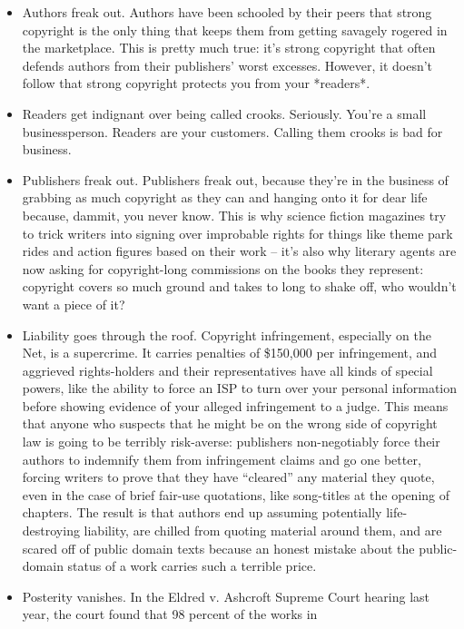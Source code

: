 \begin{itemize}
\item
  Authors freak out. Authors have been schooled by their peers that
  strong copyright is the only thing that keeps them from getting
  savagely rogered in the marketplace. This is pretty much true: it's
  strong copyright that often defends authors from their publishers'
  worst excesses. However, it doesn't follow that strong copyright
  protects you from your *readers*.
\item
  Readers get indignant over being called crooks. Seriously. You're a
  small businessperson. Readers are your customers. Calling them
  crooks is bad for business.
\item
  Publishers freak out. Publishers freak out, because they're in the
  business of grabbing as much copyright as they can and hanging onto
  it for dear life because, dammit, you never know. This is why
  science fiction magazines try to trick writers into signing over
  improbable rights for things like theme park rides and action
  figures based on their work -- it's also why literary agents are
  now asking for copyright-long commissions on the books they
  represent: copyright covers so much ground and takes to long to
  shake off, who wouldn't want a piece of it?
\item
  Liability goes through the roof. Copyright infringement, especially
  on the Net, is a supercrime. It carries penalties of \$150,000 per
  infringement, and aggrieved rights-holders and their
  representatives have all kinds of special powers, like the ability
  to force an ISP to turn over your personal information before
  showing evidence of your alleged infringement to a judge. This
  means that anyone who suspects that he might be on the wrong side
  of copyright law is going to be terribly risk-averse: publishers
  non-negotiably force their authors to indemnify them from
  infringement claims and go one better, forcing writers to prove
  that they have ``cleared'' any material they quote, even in the case
  of brief fair-use quotations, like song-titles at the opening of
  chapters. The result is that authors end up assuming potentially
  life-destroying liability, are chilled from quoting material around
  them, and are scared off of public domain texts because an honest
  mistake about the public-domain status of a work carries such a
  terrible price.
\item
  Posterity vanishes. In the Eldred v. Ashcroft Supreme Court hearing
  last year, the court found that 98 percent of the works in

\end{itemize}
